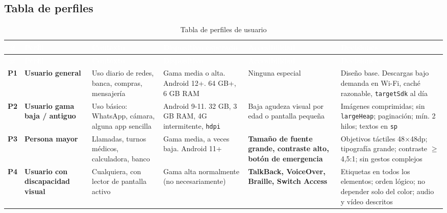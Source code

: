 \documentclass[11pt,a4paper]{article}
\newcommand{\code}[1]{\texttt{\color{primary}#1}}
\begin{document}
	\subsection{Tabla de perfiles}
	
	{\footnotesize
		\begin{xltabular}{\textwidth}{@{}c >{\RaggedRight\arraybackslash}p{2.4cm} >{\RaggedRight\arraybackslash}p{2.5cm} >{\RaggedRight\arraybackslash}p{2.7cm} >{\RaggedRight\arraybackslash}p{2.7cm} >{\RaggedRight\arraybackslash}X@{}}
			\caption{Tabla de perfiles de usuario}\label{tab:perfiles}\\
			\toprule
			\textcolor{white}{\sffamily\bfseries \#} & \textcolor{white}{\sffamily\bfseries Perfil} & \textcolor{white}{\sffamily\bfseries Contexto} & \textcolor{white}{\sffamily\bfseries Dispositivo esperado} & \textcolor{white}{\sffamily\bfseries Accesibilidad} & \textcolor{white}{\sffamily\bfseries Decisiones} \\
			\midrule
			\endfirsthead
			\toprule
			\textcolor{white}{\sffamily\bfseries \#} & \textcolor{white}{\sffamily\bfseries Perfil} & \textcolor{white}{\sffamily\bfseries Contexto} & \textcolor{white}{\sffamily\bfseries Dispositivo} & \textcolor{white}{\sffamily\bfseries Accesibilidad} & \textcolor{white}{\sffamily\bfseries Decisiones} \\
			\midrule
			\endhead
			\bottomrule
			\endlastfoot
			\textbf{P1} & \textbf{Usuario general} & Uso diario de redes, banca, compras, mensajería & Gama media o alta. Android 12+. 64 GB+, 6 GB RAM & Ninguna especial & Diseño base. Descargas bajo demanda en Wi-Fi, caché razonable, \code{targetSdk} al día \\
			\textbf{P2} & \textbf{Usuario gama baja / antiguo} & Uso básico: WhatsApp, cámara, alguna app sencilla & Android 9-11. 32 GB, 3 GB RAM, 4G intermitente, \code{hdpi} & Baja agudeza visual por edad o pantalla pequeña & Imágenes comprimidas; sin \code{largeHeap}; paginación; mín. 2 hilos; textos en \code{sp} \\
			\textbf{P3} & \textbf{Persona mayor} & Llamadas, turnos médicos, calculadora, banco & Gama media, a veces baja. Android 11+ & \textbf{Tamaño de fuente grande, contraste alto, botón de emergencia} & Objetivos táctiles 48$\times$48dp; tipografía grande; contraste $\geq$ 4,5:1; sin gestos complejos \\
			\textbf{P4} & \textbf{Usuario con discapacidad visual} & Cualquiera, con lector de pantalla activo & Gama alta normalmente (no necesariamente) & \textbf{TalkBack, VoiceOver, Braille, Switch Access} & Etiquetas en todos los elementos; orden lógico; no depender solo del color; audio y vídeo descritos \\

\end{xltabular}}
\end{document}
